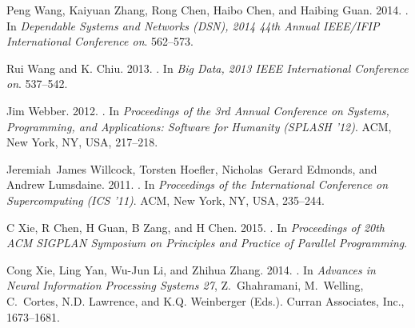 \documentclass[reprint,twocolumn,showpacs,preprintnumbers,amsmath, aps,pre,amssymb]{revtex4-1}
\begin{document}
\begin{thebibliography}{00}
{
{Peng Wang}, {Kaiyuan Zhang}, {Rong Chen}, {Haibo Chen}, {and} {Haibing Guan}.
  2014.
\newblock {}. In {\em Dependable Systems and Networks (DSN), 2014 44th
  Annual IEEE/IFIP International Conference on}. 562--573.
\newblock
{}


{Rui Wang} {and} {K. Chiu}. 2013.
\newblock {}. In {\em Big Data, 2013 IEEE International
  Conference on}. 537--542.
\newblock
{}


{Jim Webber}. 2012.
\newblock {}. In {\em
  Proceedings of the 3rd Annual Conference on Systems, Programming, and
  Applications: Software for Humanity} {\em (SPLASH '12)}. ACM, New York, NY,
  USA, 217--218.
\newblock
{}


{Jeremiah~James Willcock}, {Torsten Hoefler}, {Nicholas~Gerard Edmonds}, {and}
  {Andrew Lumsdaine}. 2011.
\newblock {}. In {\em Proceedings of the International
  Conference on Supercomputing} {\em (ICS '11)}. ACM, New York, NY, USA,
  235--244.
\newblock
{}


{C Xie}, {R Chen}, {H Guan}, {B Zang}, {and} {H Chen}. 2015.
\newblock {}. In {\em Proceedings of 20th ACM SIGPLAN
  Symposium on Principles and Practice of Parallel Programming}.
\newblock


{Cong Xie}, {Ling Yan}, {Wu-Jun Li}, {and} {Zhihua Zhang}. 2014.
\newblock {}. In {\em Advances in Neural Information Processing
  Systems 27}, {Z.~Ghahramani}, {M.~Welling}, {C.~Cortes}, {N.D. Lawrence},
  {and} {K.Q. Weinberger} (Eds.). Curran Associates, Inc., 1673--1681.
\newblock
{}


}
\end{thebibliography}
\end{document}
